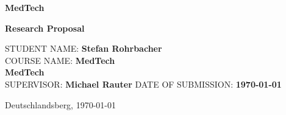 \makeatletter

\begin{titlepage}
	\thispagestyle{empty}
	\vspace*{\dimexpr-1cm-\topmargin-\headsep-\headheight-\baselineskip}%
	\hspace*{\dimexpr-4cm-\evensidemargin-\parindent}%

	\begin{center}
		{\noindent \linespread{1.3} \color{header-blue} \Huge \textbf{\@title} \par }
		\vspace{5pt}
		{\noindent\Huge \textbf{MedTech} \par}
		{\noindent\Huge \textbf{Research Proposal} \par}
		\vspace{20pt}
	\end{center}
	\hspace{-35mm}

	\vspace{15pt}

	\tabto{2cm}STUDENT NAME: \tabto{7cm}\textbf{Stefan Rohrbacher} \\
	\tabto{2cm}COURSE NAME: \tabto{7cm}\textbf{MedTech}\\
	\tabto{7cm}\textbf{MedTech} \\
	\vspace{15pt}
	\tabto{2cm}SUPERVISOR: \tabto{7cm}\textbf{Michael Rauter}
	\tabto{2cm}DATE OF SUBMISSION: \tabto{7cm}\textbf{\today}

	\vfill

	Deutschlandsberg, \today

\end{titlepage}
\makeatother

